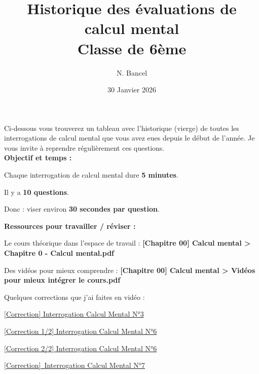 \documentclass[answers]{exam}
\title{Historique des évaluations de calcul mental \\ Classe de 6ème}
\author{N. Bancel}
\date{30 Janvier 2026}
\begin{document}
{\let\newpage\relax\maketitle}

\begin{Indication}
Ci-dessous vous trouverez un tableau avec l'historique (vierge) de toutes les interrogations de calcul mental que vous avez eues depuis le début de l'année. Je vous invite à reprendre régulièrement ces questions.
\vspace{1em} \\
\textbf{Objectif et temps :}
\begin{compactitem}
  \item Chaque interrogation de calcul mental dure \textbf{5 minutes}.
  \item Il y a \textbf{10 questions}.
  \item Donc : viser environ \textbf{30 secondes par question}.
\end{compactitem}
\vspace{1em}
\textbf{Ressources pour travailler / réviser :}
\begin{compactitem}
  \item Le cours théorique dans l'espace de travail : \textbf{[Chapitre 00] Calcul mental > Chapitre 0 - Calcul mental.pdf} 
  \item Des vidéos pour mieux comprendre : \textbf{[Chapitre 00] Calcul mental > Vidéos pour mieux intégrer le cours.pdf} 
  \item Quelques corrections que j'ai faites en vidéo : 
  \begin{compactitem}
      \item \href{https://www.loom.com/share/60ca42f3b2f841c4945bbd4c3c03bcf6}{[Correction] Interrogation Calcul Mental N°3}
      \item \href{https://www.loom.com/share/14d597a7dda741c298b08c6ffd6b81a5}{[Correction 1/2] Interrogation Calcul Mental N°6}
      \item \href{https://www.loom.com/share/0d3d3eea160e4fa6aa2b5d8d9f4a059e}{[Correction 2/2] Interrogation Calcul Mental N°6}
      \item \href{https://www.loom.com/share/4c39cf223f4946aaacf99402cb01882a}{[Correction] Interrogation Calcul Mental N°7}
  \end{compactitem}
  
\end{compactitem}

\end{Indication}
\end{document}
